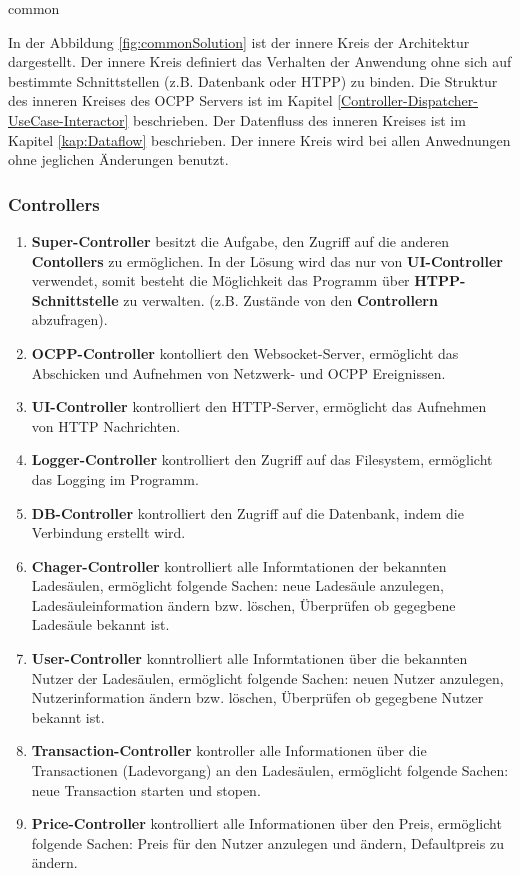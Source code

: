 {common}

In der Abbildung \ref{fig:commonSolution} ist der innere Kreis der Architektur dargestellt. Der innere Kreis definiert das Verhalten der Anwendung 
ohne sich auf bestimmte Schnittstellen (z.B. Datenbank oder HTPP) zu binden. 
Die Struktur des inneren Kreises des OCPP Servers ist im Kapitel \ref{Controller-Dispatcher-UseCase-Interactor} beschrieben. 
Der Datenfluss des inneren Kreises ist im Kapitel \ref{kap:Dataflow} beschrieben.
Der innere Kreis wird bei allen Anwednungen ohne jeglichen Änderungen benutzt.

\subsubsection{Controllers}

\begin{enumerate}
    \item \textbf{Super-Controller} besitzt die Aufgabe, den Zugriff auf die anderen \textbf{Contollers} zu ermöglichen. 
    In der Lösung wird das nur von \textbf{UI-Controller} verwendet, somit besteht die Möglichkeit das Programm über \textbf{HTPP-Schnittstelle} zu verwalten. 
    (z.B. Zustände von den \textbf{Controllern} abzufragen).
    \item \textbf{OCPP-Controller} kontolliert den Websocket-Server, ermöglicht das Abschicken und Aufnehmen von Netzwerk- und OCPP Ereignissen.
    \item \textbf{UI-Controller} kontrolliert den HTTP-Server, ermöglicht das Aufnehmen von HTTP Nachrichten.
    \item \textbf{Logger-Controller} kontrolliert den Zugriff auf das Filesystem, ermöglicht das Logging im Programm.
    \item \textbf{DB-Controller} kontrolliert den Zugriff auf die Datenbank, indem die Verbindung erstellt wird.
    \item \textbf{Chager-Controller} kontrolliert alle Informtationen der bekannten Ladesäulen, 
    ermöglicht folgende Sachen: neue Ladesäule anzulegen, Ladesäuleinformation ändern bzw. löschen, Überprüfen ob gegegbene Ladesäule bekannt ist.
    \item \textbf{User-Controller} konntrolliert alle Informtationen über die bekannten Nutzer der Ladesäulen, ermöglicht folgende Sachen:
    neuen Nutzer anzulegen, Nutzerinformation ändern bzw. löschen, Überprüfen ob gegegbene Nutzer bekannt ist.
    \item \textbf{Transaction-Controller} kontroller alle Informationen über die Transactionen (Ladevorgang) an den Ladesäulen, 
    ermöglicht folgende Sachen: neue Transaction starten und stopen.
    \item \textbf{Price-Controller} kontrolliert alle Informationen über den Preis, ermöglicht folgende Sachen:
    Preis für den Nutzer anzulegen und ändern, Defaultpreis zu ändern.
\end{enumerate}

